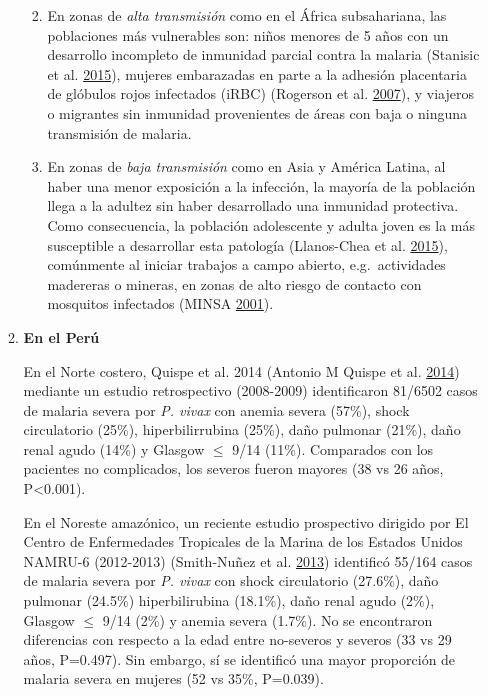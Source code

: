 \documentclass[a4paper]{article}
\providecommand{\tightlist}{%
  \setlength{\itemsep}{0pt}\setlength{\parskip}{0pt}}
\begin{document}
\begin{enumerate}
\begin{enumerate}
    \begin{enumerate}
    \def\labelenumiii{\arabic{enumiii}.}
    \tightlist
    \item
      En zonas de \emph{alta transmisión} como en el África
      subsahariana, las poblaciones más vulnerables son: niños menores
      de 5 años con un desarrollo incompleto de inmunidad parcial contra
      la malaria (Stanisic et al.
      \protect\hyperlink{ref-Stanisic2015}{2015}), mujeres embarazadas
      en parte a la adhesión placentaria de glóbulos rojos infectados
      (iRBC) (Rogerson et al.
      \protect\hyperlink{ref-rogerson2007preg}{2007}), y viajeros o
      migrantes sin inmunidad provenientes de áreas con baja o ninguna
      transmisión de malaria.
    \item
      En zonas de \emph{baja transmisión} como en Asia y América Latina,
      al haber una menor exposición a la infección, la mayoría de la
      población llega a la adultez sin haber desarrollado una inmunidad
      protectiva. Como consecuencia, la población adolescente y adulta
      joven es la más susceptible a desarrollar esta patología
      (Llanos-Chea et al. \protect\hyperlink{ref-llanoschea2015}{2015}),
      comúnmente al iniciar trabajos a campo abierto, e.g.~actividades
      madereras o mineras, en zonas de alto riesgo de contacto con
      mosquitos infectados (MINSA
      \protect\hyperlink{ref-factores2001}{2001}).
    \end{enumerate}
  \item
    \textbf{En el Perú}

    En el Norte costero, Quispe et al. 2014 (Antonio M Quispe et al.
    \protect\hyperlink{ref-quispe2014}{2014}) mediante un estudio
    retrospectivo (2008-2009) identificaron 81/6502 casos de malaria
    severa por \emph{P. vivax} con anemia severa (57\%), shock
    circulatorio (25\%), hiperbilirrubina (25\%), daño pulmonar (21\%),
    daño renal agudo (14\%) y Glasgow \(\le\) 9/14 (11\%). Comparados
    con los pacientes no complicados, los severos fueron mayores (38 vs
    26 años, P\textless{}0.001).

    En el Noreste amazónico, un reciente estudio prospectivo dirigido
    por El Centro de Enfermedades Tropicales de la Marina de los Estados
    Unidos NAMRU-6 (2012-2013) (Smith-Nuñez et al.
    \protect\hyperlink{ref-smith2013}{2013}) identificó 55/164 casos de
    malaria severa por \emph{P. vivax} con shock circulatorio (27.6\%),
    daño pulmonar (24.5\%) hiperbilirubina (18.1\%), daño renal agudo
    (2\%), Glasgow \(\le\) 9/14 (2\%) y anemia severa (1.7\%). No se
    encontraron diferencias con respecto a la edad entre no-severos y
    severos (33 vs 29 años, P=0.497). Sin embargo, sí se identificó una
    mayor proporción de malaria severa en mujeres (52 vs 35\%, P=0.039).
  \end{enumerate}
\end{enumerate}
\end{document}
